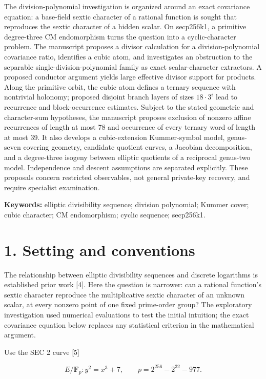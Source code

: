 \documentclass[
  11pt,
  a4paper,
]{article}
\begin{document}
The division-polynomial investigation is organized around an exact
covariance equation: a base-field sextic character of a rational
function is sought that reproduces the sextic character of a hidden
scalar. On secp256k1, a primitive degree-three CM endomorphism turns the
question into a cyclic-character problem. The manuscript proposes a
divisor calculation for a division-polynomial covariance ratio,
identifies a cubic atom, and investigates an obstruction to the
separable single-division-polynomial family as exact scalar-character
extractors. A proposed conductor argument yields large effective divisor
support for products. Along the primitive orbit, the cubic atom defines
a ternary sequence with nontrivial holonomy; proposed disjoint branch
layers of sizes \(18\cdot3^i\) lead to recurrence and block-occurrence
estimates. Subject to the stated geometric and character-sum hypotheses,
the manuscript proposes exclusion of nonzero affine recurrences of
length at most 78 and occurrence of every ternary word of length at most
39. It also develops a cubic-extension Kummer-symbol model, genus-seven
covering geometry, candidate quotient curves, a Jacobian decomposition,
and a degree-three isogeny between elliptic quotients of a reciprocal
genus-two model. Independence and descent assumptions are separated
explicitly. These proposals concern restricted observables, not general
private-key recovery, and require specialist examination.

\textbf{Keywords:} elliptic divisibility sequence; division polynomial;
Kummer cover; cubic character; CM endomorphism; cyclic sequence;
secp256k1.

\section{1. Setting and conventions}\label{setting-and-conventions}

The relationship between elliptic divisibility sequences and discrete
logarithms is established prior work {[}4{]}. Here the question is
narrower: can a rational function's sextic character reproduce the
multiplicative sextic character of an unknown scalar, at every nonzero
point of one fixed prime-order group? The exploratory investigation used
numerical evaluations to test the initial intuition; the exact
covariance equation below replaces any statistical criterion in the
mathematical argument.

Use the SEC 2 curve {[}5{]}

\[
E/\mathbf F_p:y^2=x^3+7,\qquad p=2^{256}-2^{32}-977.
\]
\end{document}
